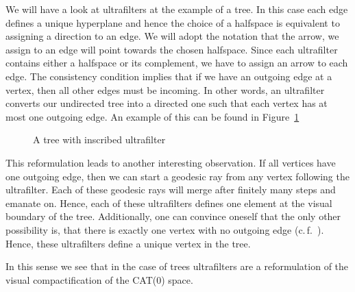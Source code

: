 \begin{bsp}
  We will have a look at ultrafilters at the example of a tree. In this case each edge defines a unique hyperplane and hence the choice of a halfspace is equivalent to assigning a direction to an edge. We will adopt the notation that the arrow, we assign to an edge will point towards the chosen halfspace. Since each ultrafilter contains either a halfspace or its complement, we have to assign an arrow to each edge. The consistency condition implies that if we have an outgoing edge at a vertex, then all other edges must be incoming. In other words, an ultrafilter converts our undirected tree into a directed one such that each vertex has at most one outgoing edge. An example of this can be found in Figure~\ref{fig:ultrafilter}
  \begin{figure}[htbp]
    \centering
    
    \caption{A tree with inscribed ultrafilter}
    \label{fig:ultrafilter}
  \end{figure}

  This reformulation leads to another interesting observation. If all vertices have one outgoing edge, then we can start a geodesic ray from any vertex following the ultrafilter. Each of these geodesic rays will merge after finitely many steps and emanate on. Hence, each of these ultrafilters defines one element at the visual boundary of the tree. Additionally, one can convince oneself that the only other possibility is, that there is exactly one vertex with no outgoing edge (c.\,f.~\cite[14]{sageev-lecture-notes}). Hence, these ultrafilters define a unique vertex in the tree.

  In this sense we see that in the case of trees ultrafilters are a reformulation of the visual compactification of the CAT(0) space. 
\end{bsp}



